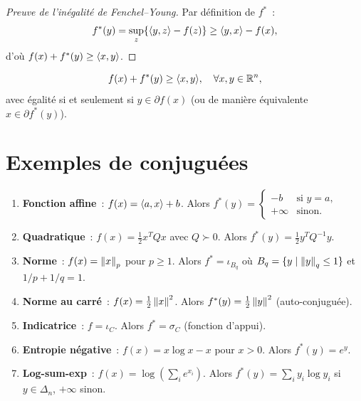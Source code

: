 \begin{proof}[Preuve de l'in\'egalit\'e de Fenchel--Young]
Par d\'efinition de $f^*$~:
\[
    f^*(y) = \sup_{z} \{\langle y, z \rangle - f(z)\} \geq \langle y, x \rangle - f(x),
\]
d'o\`u $f(x) + f^*(y) \geq \langle x, y \rangle$.
\end{proof}

\begin{formules}[title=\textbf{In\'egalit\'e de Fenchel--Young}]
\[
    f(x) + f^*(y) \geq \langle x, y \rangle, \quad \forall x, y \in \mathbb{R}^n,
\]
avec \'egalit\'e si et seulement si $y \in \partial f(x)$ (ou de mani\`ere \'equivalente
$x \in \partial f^*(y)$).
\end{formules}

\section{Exemples de conjugu\'ees}

\begin{exemple}
\begin{enumerate}
    \item \textbf{Fonction affine}~: $f(x) = \langle a, x \rangle + b$.
    Alors $f^*(y) = \begin{cases} -b & \text{si } y = a, \\ +\infty & \text{sinon.}\end{cases}$

    \item \textbf{Quadratique}~: $f(x) = \frac{1}{2}x^TQx$ avec $Q \succ 0$.
    Alors $f^*(y) = \frac{1}{2}y^TQ^{-1}y$.

    \item \textbf{Norme}~: $f(x) = \left\| x \right\|_p$ pour $p \geq 1$.
    Alors $f^* = \iota_{B_q}$ o\`u $B_q = \{y \mid \left\| y \right\|_q \leq 1\}$ et
    $1/p + 1/q = 1$.

    \item \textbf{Norme au carr\'e}~: $f(x) = \frac{1}{2}\left\| x \right\|^2$.
    Alors $f^*(y) = \frac{1}{2}\left\| y \right\|^2$ (auto-conjugu\'ee).

    \item \textbf{Indicatrice}~: $f = \iota_C$.
    Alors $f^* = \sigma_C$ (fonction d'appui).

    \item \textbf{Entropie n\'egative}~: $f(x) = x\log x - x$ pour $x > 0$.
    Alors $f^*(y) = e^y$.

    \item \textbf{Log-sum-exp}~: $f(x) = \log(\sum_i e^{x_i})$.
    Alors $f^*(y) = \sum_i y_i \log y_i$ si $y \in \Delta_n$, $+\infty$ sinon.
\end{enumerate}
\end{exemple}

